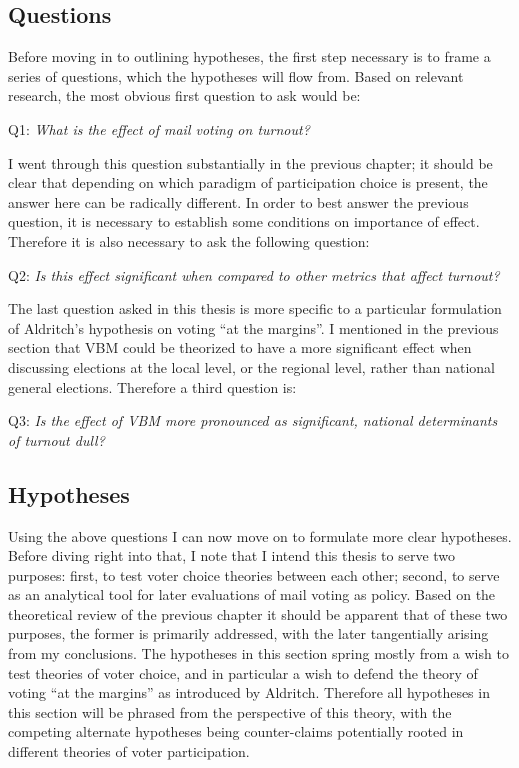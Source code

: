 \documentclass[12pt,twoside]{reedthesis}
\begin{document}
  \subsection{Questions}\label{questions}
  
  Before moving in to outlining hypotheses, the first step necessary is to
  frame a series of questions, which the hypotheses will flow from. Based
  on relevant research, the most obvious first question to ask would be:
  
  \begin{center}
  Q1: \textit{What is the effect of mail voting on turnout?}
  \end{center}
  
  I went through this question substantially in the previous chapter; it
  should be clear that depending on which paradigm of participation choice
  is present, the answer here can be radically different. In order to best
  answer the previous question, it is necessary to establish some
  conditions on importance of effect. Therefore it is also necessary to
  ask the following question:
  
  \begin{center}   
  Q2: \textit{Is  this  effect  significant  when  compared  to  other  metrics  that  affect  turnout?}
  \end{center}
  
  The last question asked in this thesis is more specific to a particular
  formulation of Aldritch's hypothesis on voting ``at the margins''. I
  mentioned in the previous section that VBM could be theorized to have a
  more significant effect when discussing elections at the local level, or
  the regional level, rather than national general elections. Therefore a
  third question is:
  
  \begin{center}   
  Q3: \textit{Is  the  effect  of  VBM  more  pronounced  as  significant,  national  determinants  of  turnout  dull?}
  \end{center}
  
  \subsection{Hypotheses}\label{hypotheses-1}
  
  Using the above questions I can now move on to formulate more clear
  hypotheses. Before diving right into that, I note that I intend this
  thesis to serve two purposes: first, to test voter choice theories
  between each other; second, to serve as an analytical tool for later
  evaluations of mail voting as policy. Based on the theoretical review of
  the previous chapter it should be apparent that of these two purposes,
  the former is primarily addressed, with the later tangentially arising
  from my conclusions. The hypotheses in this section spring mostly from a
  wish to test theories of voter choice, and in particular a wish to
  defend the theory of voting ``at the margins'' as introduced by
  Aldritch. Therefore all hypotheses in this section will be phrased from
  the perspective of this theory, with the competing alternate hypotheses
  being counter-claims potentially rooted in different theories of voter
  participation.
  
\end{document}
